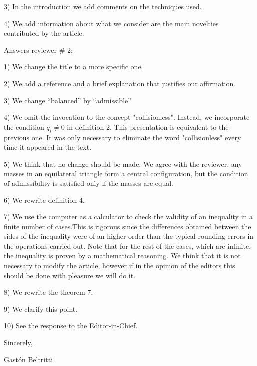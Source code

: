 \documentclass{article}
\begin{document}
3) In the introduction we add comments on the techniques used.

4) We add information about what we consider are the main novelties contributed by the article.


Answers  reviewer # 2:

1) We change the title to a more specific one.

2) We add a reference and a brief explanation that justifies our affirmation.

3) We change ``balanced'' by ``admissible''

4) We omit the invocation to the concept  "collisionless". Instead, we incorporate the condition $q_i \neq 0$ in definition 2. This presentation is equivalent to the previous one. It was only necessary to eliminate the word "collisionless" every time it appeared in the text.

5) We think that no change should be made. We agree with the reviewer, any masses in an equilateral triangle form a central configuration, but the condition of admissibility is satisfied only if the masses are equal.

6) We rewrite definition 4.

7) We use the computer as a calculator to check the validity of an inequality in a finite number of cases.This is rigorous since the differences obtained between the sides of the inequality were  of an higher order than the typical rounding errors in the operations carried out. Note that for the rest of the cases, which are infinite, the inequality is proven by a mathematical reasoning. We think that it is not necessary to modify the article, however if in the opinion of the editors this should be done with pleasure we will do it.

8) We rewrite the theorem 7.

9) We clarify this point.

10) See the response to the Editor-in-Chief.



Sincerely,
\vspace{.5cm}

Gast\'on Beltritti
\end{document}
